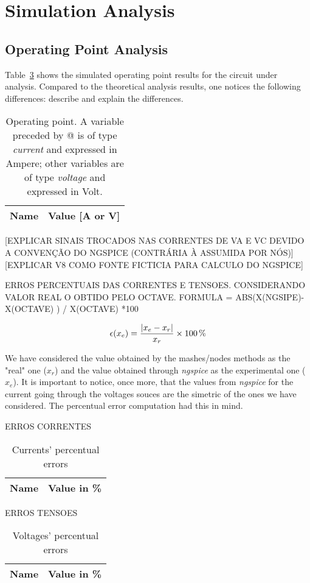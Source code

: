 \section{Simulation Analysis}
\label{sec:simulation}

\subsection{Operating Point Analysis}

Table~\ref{tab:op} shows the simulated operating point results for the circuit
under analysis. Compared to the theoretical analysis results, one notices the
following differences: describe and explain the differences.

\begin{table}[H]
  \centering
  \begin{tabular}{|l|r|}
    \hline
    {\bf Name} & {\bf Value [A or V]} \\ \hline
    
  \end{tabular}
  \caption{Operating point. A variable preceded by @ is of type {\em current}
    and expressed in Ampere; other variables are of type {\it voltage} and expressed in
    Volt.}
  \label{tab:op}
\end{table}

[EXPLICAR SINAIS TROCADOS NAS CORRENTES DE VA E VC DEVIDO A CONVENÇÃO DO NGSPICE (CONTRÁRIA À ASSUMIDA POR NÓS)]
[EXPLICAR V8 COMO FONTE FICTICIA PARA CALCULO DO NGSPICE]

ERROS PERCENTUAIS DAS CORRENTES E TENSOES. CONSIDERANDO VALOR REAL O OBTIDO PELO OCTAVE.
FORMULA = ABS(X(NGSIPE)-X(OCTAVE) ) / X(OCTAVE) *100


\begin{equation}
  \centering
  \epsilon (x_e)=\frac{|x_e-x_r|}{x_r} \times 100\,\%
  \label{eq:error}
\end{equation}

We have considered the value obtained by the mashes/nodes methods as the "real" one ($x_r$) and the value obtained through \emph{ngspice} as the experimental one ($x_e$). It is important to notice, once more, that the values from \emph{ngspice} for the current going through the voltages souces are the simetric of the ones we have considered. The percentual error computation had this in mind.

ERROS CORRENTES

\begin{table}[H]
  \centering
  \begin{tabular}{|l|r|}
    \hline
    {\bf Name} & {\bf Value in \%} \\ \hline
    
  \end{tabular}
  \caption{Currents' percentual errors}
  \label{tab:op}
\end{table}

ERROS TENSOES

\begin{table}[H]
  \centering
  \begin{tabular}{|l|r|}
    \hline
    {\bf Name} & {\bf Value in \%} \\ \hline
    
  \end{tabular}
  \caption{Voltages' percentual errors }
  \label{tab:op}
\end{table}
